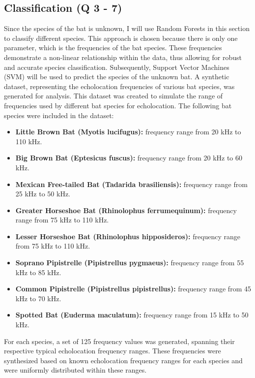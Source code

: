 \documentclass[12pt]{article}
\begin{document}
\subsection{Classification (Q 3 - 7)}
Since the species of the bat is unknown, I will use Random Forests in this section to classify different species. This approach is chosen because there is only one parameter, which is the frequencies of the bat species. These frequencies demonstrate a non-linear relationship within the data, thus allowing for robust and accurate species classification. Subsequently, Support Vector Machines (SVM) will be used to predict the species of the unknown bat. A synthetic dataset, representing the echolocation frequencies of various bat species, was generated for analysis. This dataset was created to simulate the range of frequencies used by different bat species for echolocation. The following bat species were included in the dataset:
\begin{itemize}
    \item \textbf{Little Brown Bat (Myotis lucifugus):} frequency range from 20 kHz to 110 kHz.

    \item \textbf{Big Brown Bat (Eptesicus fuscus):} frequency range from 20 kHz to 60 kHz.

    \item \textbf{Mexican Free-tailed Bat (Tadarida brasiliensis):} frequency range from 25 kHz to 50 kHz.

    \item \textbf{Greater Horseshoe Bat (Rhinolophus ferrumequinum):} frequency range from 75 kHz to 110 kHz.

    \item \textbf{Lesser Horseshoe Bat (Rhinolophus hipposideros):} frequency range from 75 kHz to 110 kHz.

    \item \textbf{Soprano Pipistrelle (Pipistrellus pygmaeus):} frequency range from 55 kHz to 85 kHz.

    \item \textbf{Common Pipistrelle (Pipistrellus pipistrellus):} frequency range from 45 kHz to 70 kHz.

    \item \textbf{Spotted Bat (Euderma maculatum):} frequency range from 15 kHz to 50 kHz.
\end{itemize}


For each species, a set of 125 frequency values was generated, spanning their respective typical echolocation frequency ranges. These frequencies were synthesized based on known echolocation frequency ranges for each species and were uniformly distributed within these ranges.
\end{document}
